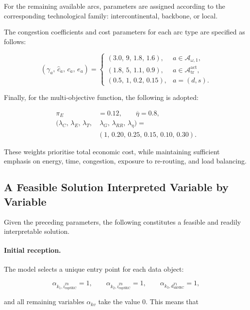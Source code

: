 \documentclass[a4paper,fleqn]{cas-dc}
\newcommand{\A}{\mathcal{A}}
\begin{document}
For the remaining available arcs, parameters are assigned according to the corresponding technological family: intercontinental, backbone, or local.

The congestion coefficients and cost parameters for each arc type are specified as follows:

\begin{equation}
(\gamma_a,\, \hat{c}_a,\, c_a,\, e_a) =
\begin{cases}
(3.0,\, 9,\, 1.8,\, 1.6), & a \in \A_{\omega,1}, \\
(1.8,\, 5,\, 1.1,\, 0.9), & a \in \A_{\mathrm{tr}}^{\mathrm{act}}, \\
(0.5,\, 1,\, 0.2,\, 0.15), & a = (d,s).
\end{cases}
\end{equation}



Finally, for the multi-objective function, the following is adopted:

\begin{align*}
\pi_E &= 0.12, \qquad \overline{\eta} = 0.8, \\[1ex]
(\lambda_C,\, \lambda_E,\, \lambda_T, & \ \lambda_G,\, \lambda_{RR},\, \lambda_{\eta}) = \\
&(1,\, 0.20,\, 0.25,\, 0.15,\, 0.10,\, 0.30).
\end{align*}


These weights prioritise total economic cost, while maintaining sufficient emphasis on energy, time, congestion, exposure to re-routing, and load balancing.


\subsection{A Feasible Solution Interpreted Variable by Variable}

Given the preceding parameters, the following constitutes a feasible and readily interpretable solution.

\paragraph{Initial reception.} 

The model selects a unique entry point for each data object:

\[
\alpha_{k_1,i_{\mathrm{espSRC}}^{T0}}=1,
\qquad
\alpha_{k_2,i_{\mathrm{espSRC}}^{T0}}=1,
\qquad
\alpha_{k_3,d_{\mathrm{ukSRC}}^{T1}}=1,
\]

and all remaining variables \(\alpha_{kv}\) take the value \(0\). This means that
\end{document}
